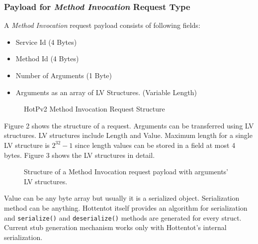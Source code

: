 \documentclass[10pt,a4paper]{article}
\begin{document}
\subsubsection {Payload for \textit{Method Invocation} Request Type}
A \textit{Method Invocation} request payload consists of following fields:
\begin{itemize}
  \item Service Id (4 Bytes)
  \item Method Id (4 Bytes)
  \item Number of Arguments (1 Byte)
  \item Arguments as an array of LV Structures. (Variable Length)
\end{itemize}

\begin{figure}[!ht]
  \caption{HotPv2 Method Invocation Request Structure}
  \centering
\end{figure}

Figure 2 shows the structure of a request. Arguments can be transferred using LV structures. LV structures include Length and Value. Maximum length for a single LV structure is $2^{32} - 1$ since length values can be stored in a field at most 4 bytes. Figure 3 shows the LV structures in detail.

\begin{figure}[!ht]
  \caption{Structure of a Method Invocation request payload with arguments' LV structures.}
  \centering
\end{figure}

Value can be any byte array but usually it is a serialized object. Serialization method can be anything. Hottentot itself provides an algorithm for serialization and \texttt {serialize()} and \texttt {deserialize()} methods are generated for every struct. Current stub generation mechanism works only with Hottentot's internal serialization.
\end{document}
